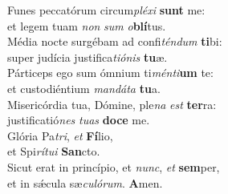 \oddverse Funes peccatórum circum\textit{plé}\textit{xi} \textbf{sunt} me:~\*\\
\oddverse et legem tuam \textit{non} \textit{sum} \textit{o}\textbf{blí}tus.\\
\evenverse Média nocte surgébam ad confi\textit{tén}\textit{dum} \textbf{ti}bi:~\*\\
\evenverse super judícia justifica\textit{ti}\textit{ó}\textit{nis} \textbf{tu}æ.\\
\oddverse Párticeps ego sum ómnium ti\textit{mén}\textit{ti}\textbf{um} te:~\*\\
\oddverse et custodiéntium \textit{man}\textit{dá}\textit{ta} \textbf{tu}a.\\
\evenverse Misericórdia tua, Dómine, ple\textit{na} \textit{est} \textbf{ter}ra:~\*\\
\evenverse justificatió\textit{nes} \textit{tu}\textit{as} \textbf{do}\textbf{ce} me.\\
\oddverse Glória Pa\textit{tri}, \textit{et} \textbf{Fí}lio,~\*\\
\oddverse et Spi\textit{rí}\textit{tu}\textit{i} \textbf{San}cto.\\
\evenverse Sicut erat in princípio, et \textit{nunc}, \textit{et} \textbf{sem}per,~\*\\
\evenverse et in sǽcula sæ\textit{cu}\textit{ló}\textit{rum}. \textbf{A}men.\\
